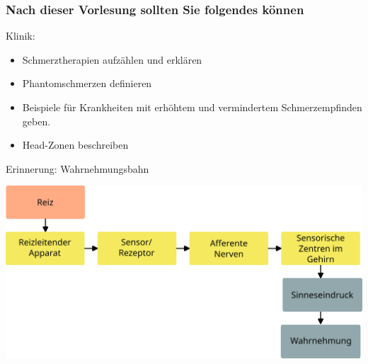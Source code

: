 \documentclass{beamer}
\begin{document}
\begin{frame}


 \frametitle{Nach dieser Vorlesung sollten Sie folgendes können}
 

\begin{block}{Klinik:}

\begin{itemize}
    
\item 
Schmerztherapien aufzählen und erklären %
    \item 
 Phantomschmerzen definieren%
    \item 
 Beispiele für Krankheiten mit erhöhtem und vermindertem Schmerzempfinden geben. %
\item
Head-Zonen beschreiben %
\end{itemize}


\end{block}



\end{frame}




\begin{frame}{Erinnerung: Wahrnehmungsbahn}
    
    \begin{center}
        \includegraphics[width=\textwidth]{wahrnehmungsprozess_ohne_beispiel.png}
    \end{center}
    
\end{frame}
\end{document}
